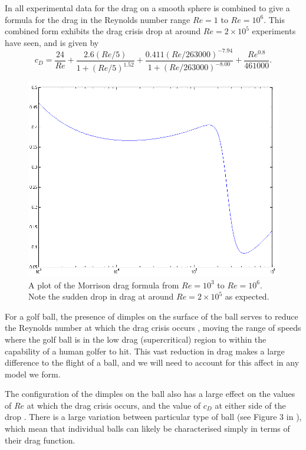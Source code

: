 In \citet{Morrison2010} all experimental data for the drag on a smooth sphere is combined to give a
formula for the drag in the Reynolds number range $Re = 1$ to $Re = 10^6$. This combined
form exhibits the drag crisis drop at around $Re = 2\times10^5$ experiments have seen, and is given by
\begin{equation} \label{drag-m}
c_D = \frac{24}{Re} + \frac{2.6(Re/5)}{1 + (Re/5)^{1.52}} + \frac{0.411(Re/263000)^{-7.94}}{1+(Re/263000)^{-8.00}}
+ \frac{Re^{0.8}}{461000} .
\end{equation}

\begin{figure}[h]
\centering
\includegraphics[scale=0.6]{../images/morrison-drag.png}
\caption[Plot of the Morrison drag formula]{A plot of the Morrison drag formula from $Re = 10^3$ to
$Re=10^6$. Note the sudden drop in drag at around $Re = 2\times10^5$ as expected.}
\end{figure}

For a golf ball, the presence of dimples on the surface of the ball serves to reduce the Reynolds
number at which the drag crisis occurs \citet{Alam2011}, moving the range of speeds where the golf
ball is in the low drag (supercritical) region to within the capability of a human golfer to hit. This
vast reduction in drag makes a large difference to the flight of a ball, and we will need to account
for this affect in any model we form.

The configuration of the dimples on the ball also has a large effect on the values of $Re$ at which 
the drag crisis occurs, and the value of $c_D$ at either side of the drop \citet{Naruo2014}. There is
a large variation between particular type of ball (see Figure 3 in \citet{Naruo2014}), which mean that
individual balls can likely be characterised simply in terms of their drag function.

